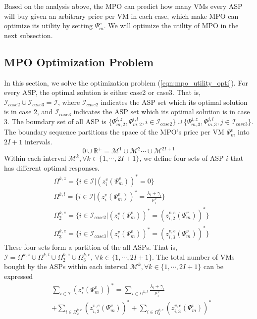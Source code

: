 \documentclass[conference]{IEEEtran}
\begin{document}
Based on the analysis above, the MPO can predict how many VMs every ASP will buy given an arbitrary price per VM in each case, which make MPO can optimize its utility by setting $\Psi_m^v$. We will optimize the utility of MPO in the next subsection. 

\subsection{MPO Optimization Problem}
In this section, we solve the optimization problem (\ref{eqn:mpo_utility_opti}). For every ASP, the optimal solution is either case2 or case3. That is, $\mathcal{I}_{case2} \cup \mathcal{I}_{case3} = \mathcal{I}$, where $\mathcal{I}_{case2}$ indicates the ASP set which its optimal solution is in case 2, and $\mathcal{I}_{case3}$ indicates the ASP set which its optimal solution is in case 3. The boundary set of all ASP is $\{\Psi_{m,2}^{i,z}, \Psi_{m,2}^{i,l}, i\in \mathcal{I}_{case2} \}\cup \{\Psi_{m,3}^{j,z}, \Psi_{m,3}^{j,l}, j\in \mathcal{I}_{case3}\}$.
The boundary sequence partitions the space of the MPO's price per VM $\Psi_m^v$ into $2I + 1$ intervals.
\begin{equation}
0 \cup \mathbb{R}^{+} = \mathcal{M}^1 \cup \mathcal{M}^2 \cdots \cup \mathcal{M}^{2I+1}
\end{equation}
Within each interval $\mathcal{M}^k, \forall k \in \{1, \cdots, 2I+1\}$, we define four sets of ASP $i$ that has different optimal responses.
\begin{equation}
\begin{aligned}
&\Omega^{k,z} = \{i \in \mathcal{I}|(z_{i}^v(\Psi_m^v))^* = 0\} \\
&\Omega^{k,l} = \{i \in \mathcal{I}|(z_{i}^v(\Psi_m^v))^* = \frac{\lambda_i + \gamma_i}{\mu_i^v}\} \\
&\Omega^{k,e}_{2} = \{i \in \mathcal{I}_{case2}|(z_{i}^v(\Psi_m^v))^* = (z_{i,2}^{v,e}(\Psi_m^v))^*\}\\
&\Omega^{k,e}_{3} = \{i \in \mathcal{I}_{case3}|(z_{i}^v(\Psi_m^v))^* = (z_{i,3}^{v,e}(\Psi_m^v))^*\}
\end{aligned}
\end{equation}
These four sets form a partition of the all ASPs. That is, $\mathcal{I} = \Omega^{k,z} \cup \Omega^{k,l} \cup \Omega^{k,e}_{2} \cup \Omega^{k,e}_{3}, \, \forall k \in \{1, \cdots, 2I+1\}$. The total number of VMs bought by the ASPs within each interval $\mathcal{M}^k, \forall k \in \{1, \cdots, 2I+1\}$ can be expressed
\begin{equation}\label{eqn:total_number_VM}
\begin{aligned}
&\sum_{i \in \mathcal{I}} (z_{i}^v(\Psi_m^v))^* =
\sum_{i\in \Omega^{k,l}}\frac{\lambda_i + \gamma_i}{\mu_i^v} \\
& + \sum_{i\in \Omega^{k,e}_{2}}(z_{i,2}^{v,e}(\Psi_m^v))^* + \sum_{i \in \Omega_3^{k,e}}(z_{i,3}^{v,e}(\Psi_m^v))^*
\end{aligned}
\end{equation}
\end{document}
